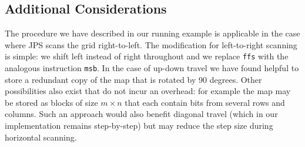 \subsection*{Additional Considerations}
The procedure we have described in our running example is applicable in the case
where JPS scans the grid right-to-left. The modification for left-to-right
scanning is simple: we shift left instead of right throughout and we
replace \texttt{ffs} with the analogous instruction \texttt{msb}.  In the case
of up-down travel we have found helpful to store a redundant copy of the
map that is rotated by 90 degrees. Other possibilities also exist that do not
incur an overhead: for example the map may be stored as blocks of size $m
\times n$ that each contain bits from several rows and columns. Such an
approach would also benefit diagonal travel (which in our implementation
remains step-by-step) but may reduce the step size during horizontal scanning.
%
%
%
%
%

